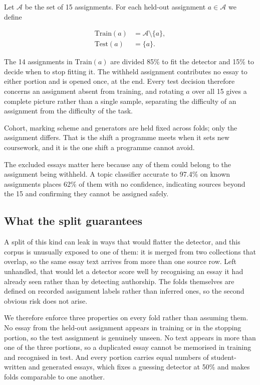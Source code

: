 \documentclass[11pt,a4paper]{article}
\begin{document}
Let $\mathcal{A}$ be the set of 15 assignments. For each held-out
assignment $a \in \mathcal{A}$ we define

\begin{align}
\mathrm{Train}(a) &= \mathcal{A} \setminus \{a\}, \\
\mathrm{Test}(a)  &= \{a\}.
\end{align}

The 14 assignments in $\mathrm{Train}(a)$ are divided 85\% to fit the
detector and 15\% to decide when to stop fitting it. The withheld
assignment contributes no essay to either portion and is opened once, at
the end. Every test decision therefore concerns an assignment absent from
training, and rotating $a$ over all 15 gives a complete picture rather than
a single sample, separating the difficulty of an assignment from the
difficulty of the task.

Cohort, marking scheme and generators are held fixed across folds; only the
assignment differs. That is the shift a programme meets when it sets new
coursework, and it is the one shift a programme cannot avoid.

The excluded essays matter here because any of them could belong to the
assignment being withheld. A topic classifier accurate to 97.4\% on known
assignments places 62\% of them with no confidence, indicating sources
beyond the 15 and confirming they cannot be assigned safely.

\subsection{What the split guarantees}

A split of this kind can leak in ways that would flatter the detector, and
this corpus is unusually exposed to one of them: it is merged from two
collections that overlap, so the same essay text arrives from more than one
source row. Left unhandled, that would let a detector score well by
recognising an essay it had already seen rather than by detecting
authorship. The folds themselves are defined on recorded assignment labels
rather than inferred ones, so the second obvious risk does not arise.

We therefore enforce three properties on every fold rather than assuming
them. No essay from the held-out assignment appears in training or in the
stopping portion, so the test assignment is genuinely unseen. No text
appears in more than one of the three portions, so a duplicated essay
cannot be memorised in training and recognised in test. And every portion
carries equal numbers of student-written and generated essays, which fixes
a guessing detector at 50\% and makes folds comparable to one another.
\end{document}
